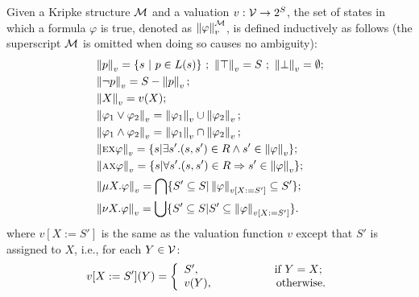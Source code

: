 \documentclass[runningheads]{llncs}
\begin{document}
Given a Kripke structure ${\cal M}$ and a valuation $v: {\cal V} \rightarrow 2^S$, the set of states
in which a formula $\varphi$ is true, denoted as $\left\| \varphi\right\|_v^{{\cal M}}$, is defined inductively as follows (the superscript ${\cal M}$ is omitted when doing so causes no ambiguity):
\begin{align*}
	& \left \| p\right \|_v = \{s\ |\ p \in L(s)\} \ ;\ \left\|\top\right\|_v = S \ ;\ \left\|\bot\right\|_v = \emptyset; \\
	& \left\|\neg p\right\|_v = S- \left\| p\right\|_v;\\
	& \left\| X\right\|_v = v(X);\\
	& \left\|\varphi_1 \vee \varphi_2\right\|_v = \left\|\varphi_1\right\|_v \cup \left\|\varphi_2\right\|_v;\\
	& \left\|\varphi_1 \wedge \varphi_2\right\|_v = \left\|\varphi_1\right\|_v \cap \left\|\varphi_2\right\|_v;\\
	& \left\|\EXIST \NEXT \varphi\right\|_v = \{s| \exists s'. (s, s') \in R \wedge s' \in \left\|\varphi\right\|_v\};\\
	& \left\|\ALL \NEXT \varphi\right\|_v = \{s| \forall s'. (s, s') \in R \Rto s' \in \left\|\varphi\right\|_v\};\\
	& \left\| \mu X. \varphi\right\|_v = \bigcap\{S' \subseteq S | \left\|\varphi\right\|_{v[X:= S']} \subseteq S'\};\\
	& \left\| \nu X. \varphi\right\|_v = \bigcup\{S' \subseteq S | S' \subseteq \left\|\varphi\right\|_{v[X:= S']}\}.
\end{align*}
where $v[X:= S']$ is the same as the valuation function $v$ except that $S'$ is assigned to $X$, i.e., for each $Y\in {\cal V}$:
\[v[X:= S'](Y) =
\left\{
\begin{array}{ll}
	S', \ \ \qquad \qquad \qquad \hbox{if $Y = X$;} \\
	v(Y), \ \ \ \qquad \qquad \ \ \hbox{otherwise.}
\end{array}
\right.
\]
\end{document}
